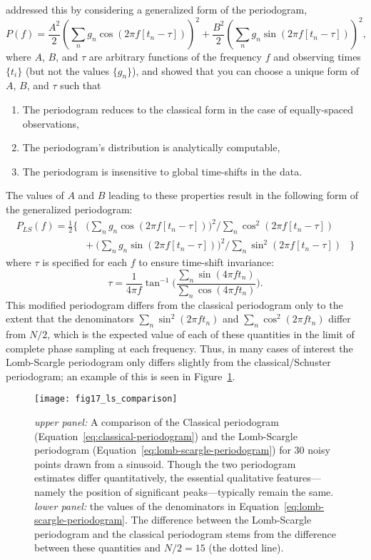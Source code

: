 \documentclass[preprint]{aastex}
\newcommand{\fig}[1]{Figure~\ref{fig:#1}}
\newcommand{\figlabel}[1]{\label{fig:#1}}
\newcommand{\Eq}[1]{Equation~\ref{eq:#1}}
\newcommand{\eq}[1]{\Eq{#1}}
\newcommand{\eqlabel}[1]{\label{eq:#1}}
\begin{document}
\citet{Scargle82} addressed this by considering a generalized form of the periodogram,
\begin{equation}
  P(f) = \frac{A^2}{2}\left(\sum_n g_n \cos(2\pi f [t_n-\tau])\right)^2
       + \frac{B^2}{2} \left(\sum_n g_n \sin(2\pi f [t_n-\tau])\right)^2,
\end{equation}
where $A$, $B$, and $\tau$ are arbitrary functions of the frequency $f$ and
observing times $\{t_i\}$ (but not the values $\{g_n\}$), and showed
that you can choose a unique form of $A$, $B$, and $\tau$ such that
\begin{enumerate}
  \item The periodogram reduces to the classical form in the case of equally-spaced observations,
  \item The periodogram's distribution is analytically computable,
  \item The periodogram is insensitive to global time-shifts in the data.
\end{enumerate}
The values of $A$ and $B$ leading to these properties result in the following
form of the generalized periodogram:
\begin{eqnarray}
  P_{LS}(f) =
  \frac{1}{2} \Bigg\{ &
  \bigg(\sum_n g_n \cos(2\pi f [t_n-\tau])\bigg)^2 \bigg/
  \sum_n \cos^2(2\pi f [t_n-\tau]) &\nonumber\\
  & + ~ \bigg(\sum_n g_n \sin(2\pi f [t_n-\tau])\bigg)^2 \bigg/
  \sum_n \sin^2(2\pi f [t_n-\tau]) & \Bigg\}
  \eqlabel{lomb-scargle-periodogram}
\end{eqnarray}
where $\tau$ is specified for each $f$ to ensure time-shift invariance:
\begin{equation}
  \tau = \frac{1}{4\pi f}\tan^{-1}\Bigg(
  \frac{\sum_n \sin(4\pi f t_n)}{\sum_n \cos(4\pi f t_n)}\Bigg).
  \eqlabel{tau-def}
\end{equation}
This modified periodogram differs from the classical periodogram only to
the extent that the denominators $\sum_n \sin^2(2\pi f t_n)$ and
$\sum_n \cos^2(2\pi f t_n)$ differ from $N/2$, which is the expected value of
each of these quantities in the limit of complete phase sampling at each
frequency.
Thus, in many cases of interest the Lomb-Scargle periodogram only differs
slightly from the classical/Schuster periodogram; an example of this is seen
in \fig{ls-comparison}.

\begin{figure}[ht]
  \centering
  \texttt{[image: fig17\_ls\_comparison]}
  \caption{{\it upper panel:} A comparison of the Classical periodogram
    (\eq{classical-periodogram}) and the Lomb-Scargle periodogram
    (\eq{lomb-scargle-periodogram}) for 30 noisy points drawn from a sinusoid.
    Though the two periodogram estimates differ quantitatively, the essential
    qualitative features---namely the position of significant peaks---typically
    remain the same.
    {\it lower panel:} the values of the denominators in
    \eq{lomb-scargle-periodogram}.
    The difference between the Lomb-Scargle periodogram and the classical
    periodogram stems from the difference between these quantities
    and $N/2 = 15$ (the dotted line).
    \figlabel{ls-comparison}}
\end{figure}
\end{document}
